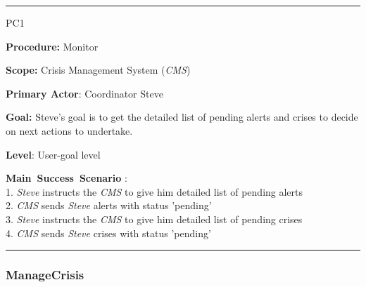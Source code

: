 \hrule
\begin{lyxlist}{PC1}
\small{
\item [\textbf{Procedure:}] Monitor
\item [\textbf{Scope:}] Crisis Management System (\emph{CMS})
\item [\textbf{Primary Actor}:] Coordinator Steve
\item [\textbf{Goal:}] Steve’s goal is to get the detailed list of
pending alerts and crises to decide on next actions to undertake.
\item [\textbf{Level}:] User-goal level
\item [\textbf{Main~Success~Scenario}]:\\
1. \emph{Steve} instructs the \emph{CMS} to give him detailed list of pending
alerts\\
2. \emph{CMS} sends \emph{Steve} alerts with status 'pending'\\
3. \emph{Steve} instructs the \emph{CMS} to give him detailed list of pending
crises\\
4. \emph{CMS} sends \emph{Steve} crises with status 'pending'

}

\end{lyxlist}
\hrule

\subsubsection{ManageCrisis}

